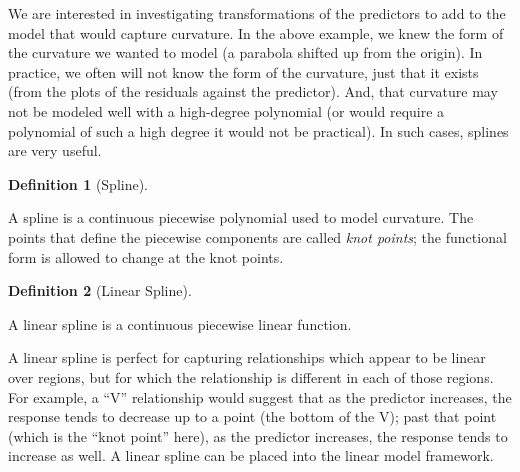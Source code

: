 \documentclass[
  letterpaper,
  DIV=11,
  numbers=noendperiod]{scrreprt}
\theoremstyle{definition}
\newtheorem{definition}{Definition}[chapter]
\theoremstyle{definition}
\theoremstyle{remark}
\begin{document}
We are interested in investigating transformations of the predictors to
add to the model that would capture curvature. In the above example, we
knew the form of the curvature we wanted to model (a parabola shifted up
from the origin). In practice, we often will not know the form of the
curvature, just that it exists (from the plots of the residuals against
the predictor). And, that curvature may not be modeled well with a
high-degree polynomial (or would require a polynomial of such a high
degree it would not be practical). In such cases, splines are very
useful.

\begin{definition}[Spline]\protect\hypertarget{def-spline}{}\label{def-spline}

A spline is a continuous piecewise polynomial used to model curvature.
The points that define the piecewise components are called \emph{knot
points}; the functional form is allowed to change at the knot points.

\end{definition}

\begin{definition}[Linear
Spline]\protect\hypertarget{def-linear-spline}{}\label{def-linear-spline}

A linear spline is a continuous piecewise linear function.

\end{definition}

A linear spline is perfect for capturing relationships which appear to
be linear over regions, but for which the relationship is different in
each of those regions. For example, a ``V'' relationship would suggest
that as the predictor increases, the response tends to decrease up to a
point (the bottom of the V); past that point (which is the ``knot
point'' here), as the predictor increases, the response tends to
increase as well. A linear spline can be placed into the linear model
framework.
\end{document}
